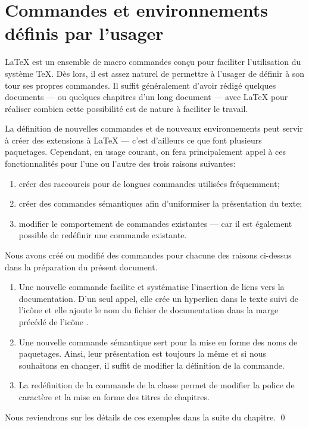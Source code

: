 \chapter{Commandes et environnements définis par l'usager}
\label{chap:commandes}

{\LaTeX} est un ensemble de macro commandes conçu pour faciliter
l'utilisation du système {\TeX}. Dès lors, il est assez naturel de
permettre à l'usager de définir à son tour ses propres commandes. Il
suffit généralement d'avoir rédigé quelques documents --- ou quelques
chapitres d'un long document --- avec {\LaTeX} pour réaliser combien
cette possibilité est de nature à faciliter le travail.

La définition de nouvelles commandes et de nouveaux environnements
peut servir à créer des extensions à {\LaTeX} --- c'est d'ailleurs ce
que font plusieurs paquetages. Cependant, en usage courant, on fera
principalement appel à ces fonctionnalités pour l'une ou l'autre des
trois raisons suivantes:

\begin{enumerate}
\item créer des raccourcis pour de longues commandes utilisées
  fréquemment;
\item créer des commandes sémantiques afin d'uniformiser la
  présentation du texte;
\item modifier le comportement de commandes existantes --- car il est
  également possible de redéfinir une commande existante.
\end{enumerate}

\begin{exemple}
  \label{ex:commandes:intro}
  Nous avons créé ou modifié des commandes pour chacune des raisons
  ci-dessus dans la préparation du présent document.
  \begin{enumerate}
  \item Une nouvelle commande \cmdprint{\doc} facilite et systématise
    l'insertion de liens vers la documentation. D'un seul appel, elle
    crée un hyperlien dans le texte suivi de l'icône {\faExternalLink}
    et elle ajoute le nom du fichier de documentation dans la marge
    précédé de l'icône {\faBook}.
  \item Une nouvelle commande sémantique \cmdprint{\pkg} sert pour la
    mise en forme des noms de paquetages. Ainsi, leur présentation est
    toujours la même et si nous souhaitons en changer, il suffit de
    modifier la définition de la commande.
  \item La redéfinition de la commande \cmd{\chaptitlefont} de la
    classe  permet de modifier la police de caractère et
    la mise en forme des titres de chapitres.
  \end{enumerate}
  Nous reviendrons sur les détails de ces exemples dans la suite du
  chapitre. %
  \qed
\end{exemple}


